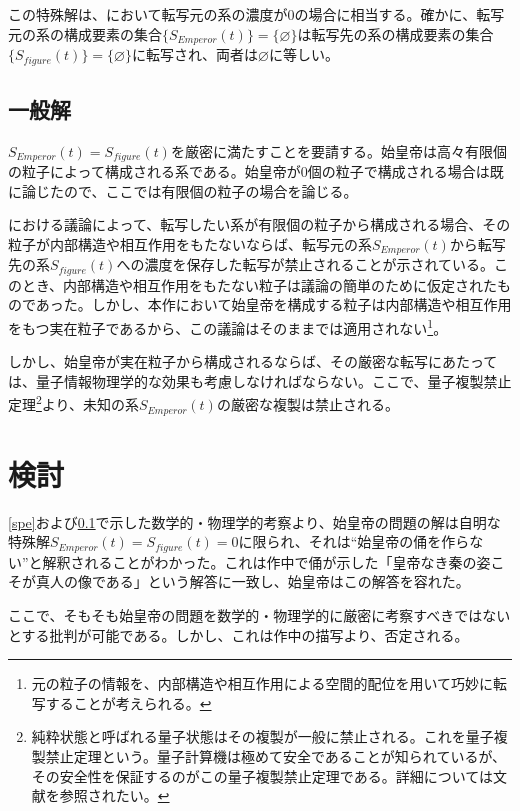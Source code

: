 \documentclass[10pt, a5paper, twoside]{jsarticle}
\theoremstyle{definition}
\begin{document}
			この特殊解は、\cite{sshimo}において転写元の系の濃度が0の場合に相当する。確かに、転写元の系の構成要素の集合$\{ S_{Emperor}(t) \} = \{ \varnothing \}$は転写先の系の構成要素の集合$\{ S_{figure}(t) \} = \{ \varnothing \}$に転写され、両者は$\varnothing$に等しい。

		\subsection{一般解}\label{gen}

			$ S_{Emperor}(t) = S_{figure}(t) $を厳密に満たすことを要請する。始皇帝は高々有限個の粒子によって構成される系である。始皇帝が0個の粒子で構成される場合は既に論じたので、ここでは有限個の粒子の場合を論じる。

			\cite{sshimo}における議論によって、転写したい系が有限個の粒子から構成される場合、その粒子が内部構造や相互作用をもたないならば、転写元の系$S_{Emperor}(t)$から転写先の系$S_{figure}(t)$への濃度を保存した転写が禁止されることが示されている。このとき、内部構造や相互作用をもたない粒子は議論の簡単のために仮定されたものであった。しかし、本作において始皇帝を構成する粒子は内部構造や相互作用をもつ実在粒子であるから、この議論はそのままでは適用されない\footnote{元の粒子の情報を、内部構造や相互作用による空間的配位を用いて巧妙に転写することが考えられる。}。

			しかし、始皇帝が実在粒子から構成されるならば、その厳密な転写にあたっては、量子情報物理学的な効果も考慮しなければならない。ここで、量子複製禁止定理\footnote{純粋状態と呼ばれる量子状態はその複製が一般に禁止される。これを量子複製禁止定理という。量子計算機は極めて安全であることが知られているが、その安全性を保証するのがこの量子複製禁止定理である。詳細については文献\cite{Hotta1,Hotta2}を参照されたい。}より、未知の系$S_{Emperor}(t)$の厳密な複製は禁止される。

		\section{検討}

			\ref{spe}および\ref{gen}で示した数学的・物理学的考察より、始皇帝の問題の解は自明な特殊解$ S_{Emperor}(t) = S_{figure}(t) = 0 $に限られ、それは“始皇帝の俑を作らない”と解釈されることがわかった。これは作中で俑が示した「皇帝なき秦の姿こそが真人の像である」という解答に一致し、始皇帝はこの解答を容れた。

			ここで、そもそも始皇帝の問題を数学的・物理学的に厳密に考察すべきではないとする批判が可能である。しかし、これは作中の描写より、否定される。
\end{document}

